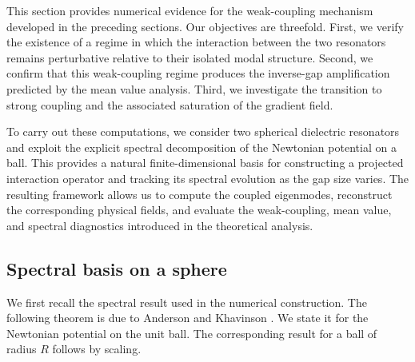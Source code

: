 \documentclass[10pt]{article}
\numberwithin{equation}{section}
\begin{document}
This section provides numerical evidence for the weak-coupling mechanism developed in the preceding sections. Our objectives are threefold. First, we verify the existence of a regime in which the interaction between the two resonators remains perturbative relative to their isolated modal structure. Second, we confirm that this weak-coupling regime produces the inverse-gap amplification predicted by the mean value analysis. Third, we investigate the transition to strong coupling and the associated saturation of the gradient field.

To carry out these computations, we consider two spherical dielectric resonators and exploit the explicit spectral decomposition of the Newtonian potential on a ball. This provides a natural finite-dimensional basis for constructing a projected interaction operator and tracking its spectral evolution as the gap size varies. The resulting framework allows us to compute the coupled eigenmodes, reconstruct the corresponding physical fields, and evaluate the weak-coupling, mean value, and spectral diagnostics introduced in the theoretical analysis.

\subsection{Spectral basis on a sphere}

We first recall the spectral result used in the numerical construction. The following theorem is due to Anderson and Khavinson \cite{anderson1992spectral}. We state it for the Newtonian potential on the unit ball. The corresponding result for a ball of radius $R$ follows by scaling.
\end{document}
